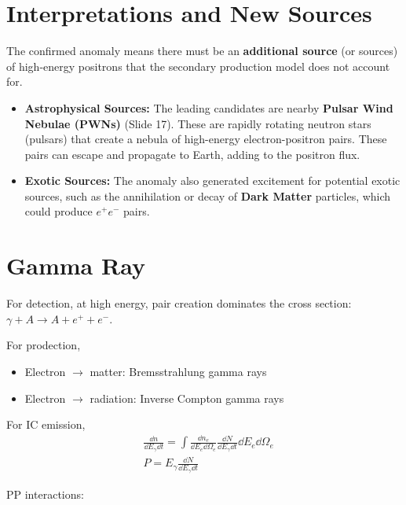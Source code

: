 \documentclass{sciposter}
\begin{document}
\begin{multicols}{3}
\section{Interpretations and New Sources}
The confirmed anomaly means there must be an \textbf{additional source} (or sources) of high-energy positrons that the secondary production model does not account for.

\begin{itemize}
    \item \textbf{Astrophysical Sources:} The leading candidates are nearby \textbf{Pulsar Wind Nebulae (PWNs)} (Slide 17). These are rapidly rotating neutron stars (pulsars) that create a nebula of high-energy electron-positron pairs. These pairs can escape and propagate to Earth, adding to the positron flux.
    \item \textbf{Exotic Sources:} The anomaly also generated excitement for potential exotic sources, such as the annihilation or decay of \textbf{Dark Matter} particles, which could produce $e^+ e^-$ pairs.
\end{itemize}


\section{Gamma Ray}
For detection, at high energy, pair creation dominates the cross section: $\gamma+A \rightarrow A+e^{+}+e^{-}  $.

For prodection,
\begin{itemize}
    \item Electron $\rightarrow$ matter: Bremsstrahlung gamma rays
    \item Electron $\rightarrow$ radiation: Inverse Compton gamma rays
\end{itemize}

For IC emission,
\begin{align}
    &\frac{\dd{n}}{\dd{E_{\gamma} }\dd{t}}=\int \frac{\dd{n_{e} }}{\dd{E_{e} \dd{\Omega_{e} }}
    }\frac{\dd{N}}{\dd{E_{\gamma} }\dd{t}}\dd{E_{e} }\dd{\Omega_{e} }\\
    &P=E_{\gamma}\frac{\dd{N}}{\dd{E_{\gamma} }\dd{t}} 
\end{align}

PP interactions:


\end{multicols}
\end{document}
